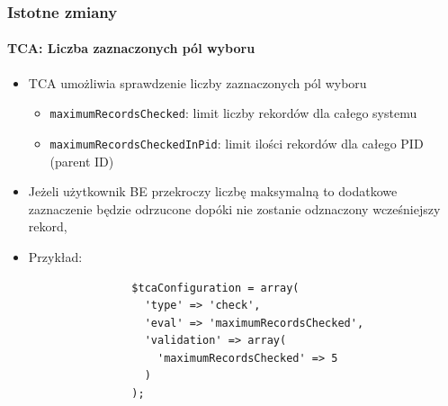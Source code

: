 \begin{frame}[fragile]
	\frametitle{Istotne zmiany}
	\framesubtitle{TCA: Liczba zaznaczonych pól wyboru}

	\lstset{
		basicstyle=\tiny\ttfamily
	}

	\begin{itemize}
		\item TCA umożliwia sprawdzenie liczby zaznaczonych pól wyboru

			\begin{itemize}
				\item \texttt{maximumRecordsChecked}:\newline
					limit liczby rekordów dla całego systemu
				\item \texttt{maximumRecordsCheckedInPid}:\newline
					limit ilości rekordów dla całego PID (parent ID)
			\end{itemize}

		\item Jeżeli użytkownik BE przekroczy liczbę
		maksymalną to dodatkowe zaznaczenie będzie odrzucone dopóki nie zostanie
		odznaczony wcześniejszy rekord,
		\item Przykład:

			\begin{lstlisting}
				$tcaConfiguration = array(
				  'type' => 'check',
				  'eval' => 'maximumRecordsChecked',
				  'validation' => array(
				    'maximumRecordsChecked' => 5
				  )
				);
			\end{lstlisting}

	\end{itemize}

\end{frame}


